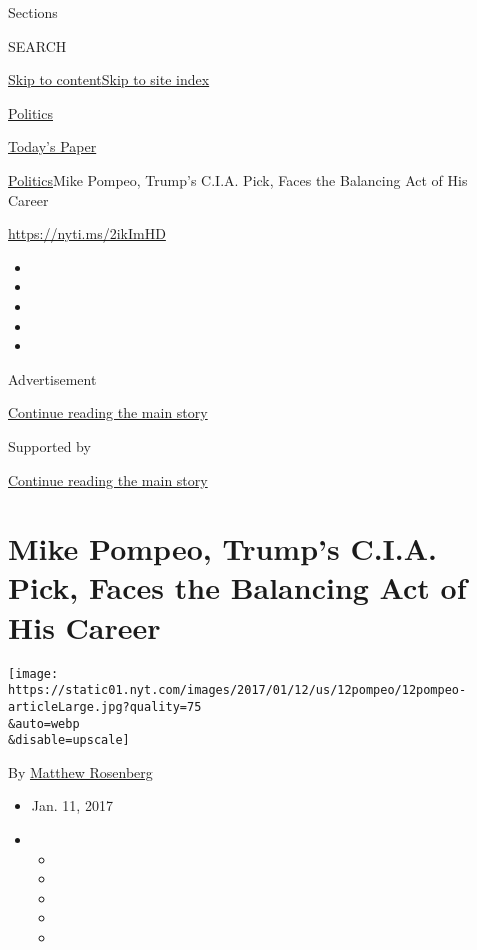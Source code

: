 Sections

SEARCH

\protect\hyperlink{site-content}{Skip to
content}\protect\hyperlink{site-index}{Skip to site index}

\href{https://www.nytimes.com/section/politics}{Politics}

\href{https://myaccount.nytimes.com/auth/login?response_type=cookie\&client_id=vi}{}

\href{https://www.nytimes.com/section/todayspaper}{Today's Paper}

\href{/section/politics}{Politics}\textbar{}Mike Pompeo, Trump's C.I.A.
Pick, Faces the Balancing Act of His Career

\url{https://nyti.ms/2ikImHD}

\begin{itemize}
\item
\item
\item
\item
\item
\end{itemize}

Advertisement

\protect\hyperlink{after-top}{Continue reading the main story}

Supported by

\protect\hyperlink{after-sponsor}{Continue reading the main story}

\hypertarget{mike-pompeo-trumps-cia-pick-faces-the-balancing-act-of-his-career}{%
\section{Mike Pompeo, Trump's C.I.A. Pick, Faces the Balancing Act of
His
Career}\label{mike-pompeo-trumps-cia-pick-faces-the-balancing-act-of-his-career}}

\texttt{[image: https://static01.nyt.com/images/2017/01/12/us/12pompeo/12pompeo-articleLarge.jpg?quality=75\\\&auto=webp\\\&disable=upscale]}

By \href{http://www.nytimes.com/by/matthew-rosenberg}{Matthew Rosenberg}

\begin{itemize}
\item
  Jan. 11, 2017
\item
  \begin{itemize}
  \item
  \item
  \item
  \item
  \item
  \end{itemize}
\end{itemize}

